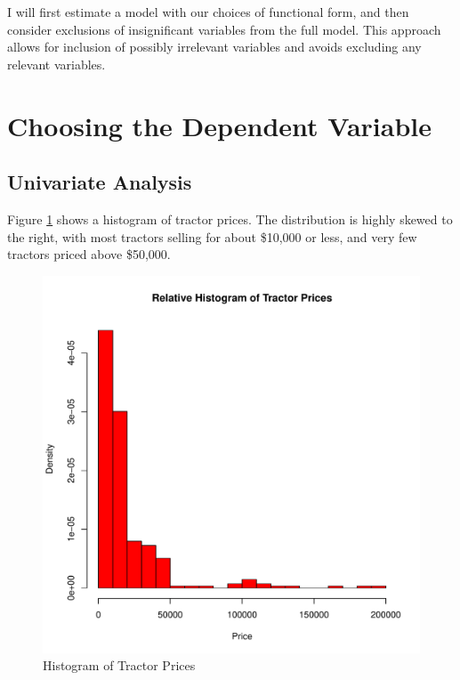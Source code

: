 \documentclass[11pt]{paper}
\begin{document}
I will first estimate a model with our choices of functional form, and then consider exclusions of insignificant variables from the full model. 
This approach allows for inclusion of possibly irrelevant variables and avoids excluding any relevant variables. 




\pagebreak
\section{Choosing the Dependent Variable}

\subsection{Univariate Analysis}

Figure \ref{fig:hist_price} shows  a histogram of tractor prices.
The distribution is highly skewed to the right, 
with most tractors selling for about \$10,000 or less,
and very few tractors priced above \$50,000.



\begin{figure}[h!]
  \centering
  \includegraphics[scale = 0.5, keepaspectratio=true]{../Figures/hist_price}
  \caption{Histogram of Tractor Prices} \label{fig:hist_price}
\end{figure}
\end{document}
